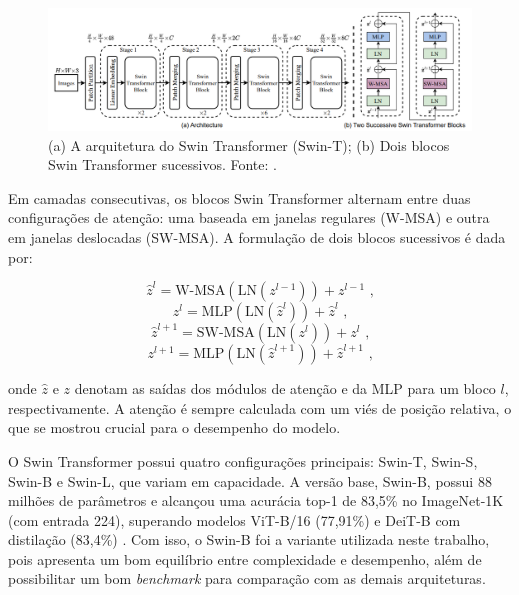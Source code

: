 \begin{figure}[h]
    \centering
    \includegraphics[width=\linewidth]{figs/swin_t-arch.png}
    \caption{(a) A arquitetura do Swin Transformer (Swin-T); (b) Dois blocos Swin Transformer sucessivos. Fonte: \cite{Liu2021}.}
    \label{fig:swin-t-arch}
\end{figure}

Em camadas consecutivas, os blocos Swin Transformer alternam entre duas configurações de atenção: uma baseada em janelas regulares (W-MSA) e outra em janelas deslocadas (SW-MSA). A formulação de dois blocos sucessivos é dada por:

\begin{equation}
    \hat{z}^{l} = \text{W-MSA}(\text{LN}(z^{l-1}))+z^{l-1} \text{ ,}
\end{equation}
\begin{equation}
    z^{l} = \text{MLP}(\text{LN}(\hat{z}^{l}))+\hat{z}^{l} \text{ ,}
\end{equation}
\begin{equation}
    \hat{z}^{l+1} = \text{SW-MSA}(\text{LN}(z^{l}))+z^{l} \text{ ,}
\end{equation}
\begin{equation}
    z^{l+1} = \text{MLP}(\text{LN}(\hat{z}^{l+1}))+\hat{z}^{l+1} \text{ ,}
\end{equation}

onde $\hat{z}$ e $z$ denotam as saídas dos módulos de atenção e da MLP para um bloco $l$, respectivamente. A atenção é sempre calculada com um viés de posição relativa, o que se mostrou crucial para o desempenho do modelo.

O Swin Transformer possui quatro configurações principais: Swin-T, Swin-S, Swin-B e Swin-L, que variam em capacidade. A versão base, Swin-B, possui 88 milhões de parâmetros e alcançou uma acurácia top-1 de 83,5\% no ImageNet-1K (com entrada 224), superando modelos ViT-B/16 (77,91\%) e DeiT-B com distilação (83,4\%) \citep{Dosovitskiy2021, Touvron2021}. Com isso, o Swin-B foi a variante utilizada neste trabalho, pois apresenta um bom equilíbrio entre complexidade e desempenho, além de possibilitar um bom \textit{benchmark} para comparação com as demais arquiteturas.

